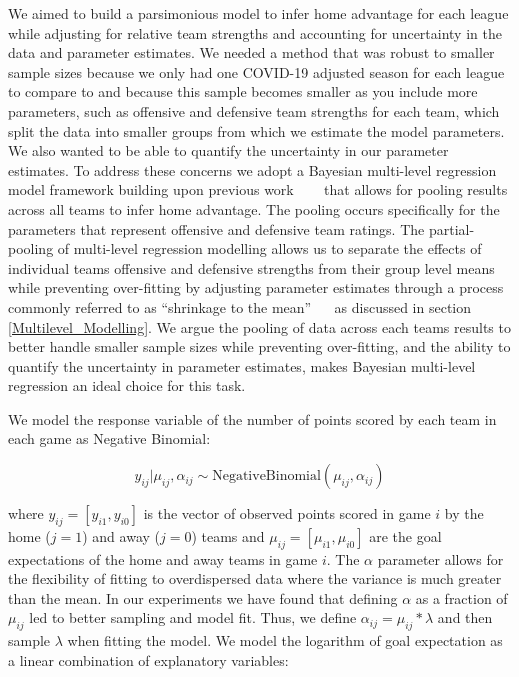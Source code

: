We aimed to build a parsimonious model to infer home advantage for each league while adjusting for relative team strengths and accounting for uncertainty in the data and parameter estimates. We needed a method that was robust to smaller sample sizes because we only had one COVID-19 adjusted season for each league to compare to and because this sample becomes smaller as you include more parameters, such as offensive and defensive team strengths for each team, which split the data into smaller groups from which we estimate the model parameters. We also wanted to be able to quantify the uncertainty in our parameter estimates. To address these concerns we adopt a Bayesian multi-level regression model framework building upon previous work \mbox{\cite{Baio2010} \cite{Glickman1998} \cite{Lopez2018} \cite{Benz2020}} that allows for pooling results across all teams to infer home advantage. The pooling occurs specifically for the parameters that represent offensive and defensive team ratings. The partial-pooling of multi-level regression modelling allows us to separate the effects of individual teams offensive and defensive strengths from their group level means while preventing over-fitting by adjusting parameter estimates through a process commonly referred to as ``shrinkage to the mean'' \mbox{\cite{Gelman2014} \cite{Gelman2006} \cite{McElreath2020}} as discussed in section \ref{Multilevel_Modelling}. We argue the pooling of data across each teams results to better handle smaller sample sizes while preventing over-fitting, and the ability to quantify the uncertainty in parameter estimates, makes Bayesian multi-level regression an ideal choice for this task.

We model the response variable of the number of points scored by each team in each game as Negative Binomial:

\begin{equation} \label{eq:likelihood}
y_{ij} | \mu_{ij}, \alpha_{ij} \sim \text{NegativeBinomial}(\mu_{ij}, \alpha_{ij})
\end{equation}

where \(y_{ij} = [y_{i1}, y_{i0}]\) is the vector of observed points scored in game \(i\) by the home (\(j=1\)) and away (\(j=0\)) teams and \(\mu_{ij} = [\mu_{i1}, \mu_{i0}]\) are the goal expectations of the home and away teams in game \(i\). The \(\alpha\) parameter allows for the flexibility of fitting to overdispersed data where the variance is much greater than the mean. In our experiments we have found that defining \(\alpha\) as a fraction of \(\mu_{ij}\) led to better sampling and model fit. Thus, we define \(\alpha_{ij} = \mu_{ij} * \lambda\) and then sample \(\lambda\) when fitting the model. We model the logarithm of goal expectation as a linear combination of explanatory variables:


